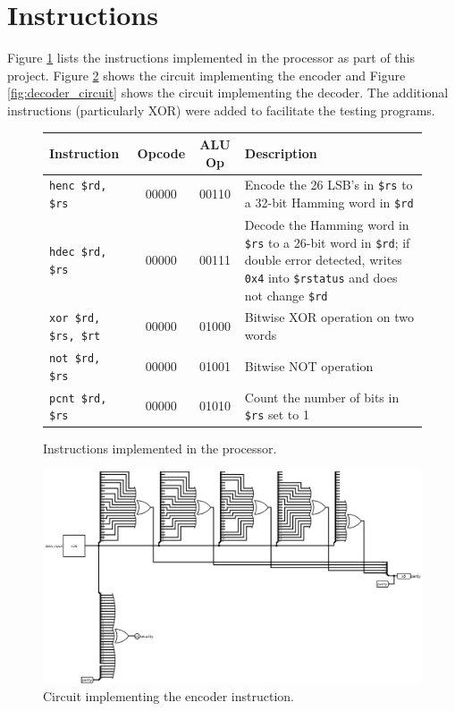 \documentclass[letterpaper]{article} %
\begin{document}
\section{Instructions}
Figure \ref{fig:instructions} lists the instructions implemented in the processor as part of this project. Figure \ref{fig:encoder_circuit} shows the circuit implementing the encoder and Figure \ref{fig:decoder_circuit} shows the circuit implementing the decoder. The additional instructions (particularly XOR) were added to facilitate the testing programs.
\begin{center}
\begin{figure}
	\begin{tabular}{|l|c|c|p{7cm}|}
		\hline
	Instruction & Opcode & ALU Op & Description \\ \hline
		\texttt{henc \$rd, \$rs} & 00000 & 00110 & Encode the 26 LSB's in \texttt{\$rs} to a 32-bit Hamming word in \texttt{\$rd} \\ \hline
		\texttt{hdec \$rd, \$rs} & 00000 & 00111 & Decode the Hamming word in \texttt{\$rs} to a 26-bit word in \texttt{\$rd}; if double error detected, writes \texttt{0x4} into \texttt{\$rstatus} and does not change \texttt{\$rd} \\ \hline
		\texttt{xor \$rd, \$rs, \$rt} & 00000 & 01000 & Bitwise XOR operation on two words \\ \hline
		\texttt{not \$rd, \$rs} & 00000 & 01001 & Bitwise NOT operation \\ \hline
		\texttt{pcnt \$rd, \$rs} & 00000 & 01010 & Count the number of bits in \texttt{\$rs} set to 1 \\ \hline
	\end{tabular}
	\caption{Instructions implemented in the processor.}
	\label{fig:instructions}
\end{figure}
\end{center}
\begin{center}
\begin{figure}
	\includegraphics[width=1\textwidth]{encoder_circuit.png}
	\caption{Circuit implementing the encoder instruction.}
	\label{fig:encoder_circuit}
\end{figure}
\end{center}
\end{document}
